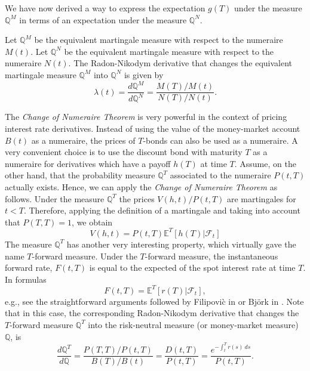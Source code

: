 We have now derived a way to express the expectation $g(T)$ under the
measure $\mathbb{Q}^M$ in terms of an expectation under the measure
$\mathbb{Q}^N$.
\begin{tma}
Let $\mathbb{Q}^M$ be the equivalent martingale measure with respect
to the numeraire $M(t)$. Let $\mathbb{Q}^N$ be the equivalent
martingale measure with respect to the numeraire $N(t)$. The
Radon-Nikodym derivative that changes the equivalent martingale
measure $\mathbb{Q}^M$ into $\mathbb{Q}^N$ is given by
$$
\lambda(t)=\frac{d\mathbb{Q}^M}{d\mathbb{Q}^N}=\frac{M(T)/M(t)}{N(T)/N(t)}.
$$
\end{tma}
The \emph{Change of Numeraire Theorem} is very powerful in the context of
pricing interest rate derivatives. Instead of using the value of the
money-market account $B(t)$ as a numeraire, the prices of $T$-bonds
can also be used as a numeraire. A very convenient choice is to use
the discount bond with maturity $T$ as a numeraire for derivatives
which have a payoff $h(T)$ at time $T$. Assume, on the other hand,
that the probability measure $\mathbb{Q}^T$ associated to the
numeraire $P(t,T)$ actually exists. Hence, we can apply the
\emph{Change of Numeraire Theorem} as follows. Under the measure
$\mathbb{Q}^T$ the prices $V(h,t)/P(t,T)$ are martingales for
$t<T$. Therefore, applying the definition of a martingale and taking
into account that $P(T,T)=1$, we obtain
\begin{equation}
\label{eq:FundEqAssetPricingForward}
V(h,t)=P(t,T)\mathbb{E}^T\left[h(T)\big|\mathcal{F}_t\right]
\end{equation}
The measure $\mathbb{Q}^T$ has another very interesting property,
which virtually gave the name $T$-forward measure. Under the
$T$-forward measure, the instantaneous forward rate, $F(t,T)$ is equal
to the expected of the spot interest rate at time $T$. In formulas
$$
F(t,T)=\mathbb{E}^T \left[ r(T)\big| \mathcal{F}_t \right],
$$
e.g., see the straightforward arguments followed by Filipovi\`c in
\cite[Sect. 7.1]{Fil:2009} or Bj\"ork in
\cite[Sect. 19.4.2]{B:2004}. Note that in this case, the corresponding
Radon-Nikodym derivative that changes the $T$-forward measure
$\mathbb{Q}^T$ into the risk-neutral measure (or money-market measure)
$\mathbb{Q}$, is 
\begin{equation}
\label{eq:ForwardTOMoneyMarket}
\frac{d\mathbb{Q}^T}{d\mathbb{Q}}=\frac{P(T,T)/P(t,T)}{B(T)/B(t)}=\frac{D(t,T)}{P(t,T)}=\frac{e^{-\int_t^T  r(s)\: ds}}{P(t,T)}.
\end{equation}

